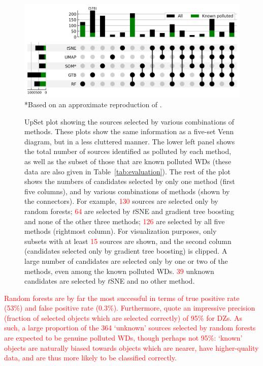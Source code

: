 \documentclass[fleqn,usenatbib]{rasti}
\newcommand{\red}[1]{\textcolor{red}{#1}}
\begin{document}
\begin{figure}
\centering
\includegraphics[width=\textwidth]{figures/fig7_upset.png}
*Based on an approximate reproduction of \citet{perezcouto24}.
\caption{
    UpSet plot \citep{lex14} showing the sources selected by various combinations of methods.
    These plots show the same information as a five-set Venn diagram, but in a less cluttered manner.
    The lower left panel shows the total number of sources identified as polluted by each method, as well as the subset of those that are known polluted WDs (these data are also given in Table~\ref{tab:evaluation}).
    The rest of the plot shows the numbers of candidates selected by only one method (first five columns), and by various combinations of methods (shown by the connectors).
    For example, \red{130} sources are selected only by random forests; \red{64} are selected by $t$SNE and gradient tree boosting and none of the other three methods; \red{126} are selected by all five methods (rightmost column).
    For visualization purposes, only subsets with at least \red{15} sources are shown, and the second column (candidates selected only by gradient tree boosting) is clipped.
    A large number of candidates are selected only by one or two of the methods, even among the known polluted WDs.
    \red{39} unknown candidates are selected by $t$SNE and no other method.
}
\label{fig:overlap}
\end{figure}

\red{
Random forests are by far the most successful in terms of true positive rate (53\%) and false positive rate (0.3\%).
Furthermore, \citet{garciazamora25} quote an impressive precision (fraction of selected objects which are selected correctly) of 95\% for DZs.
As such, a large proportion of the 364 `unknown' sources selected by random forests are expected to be genuine polluted WDs, though perhaps not 95\%: `known' objects are naturally biased towards objects which are nearer, have higher-quality data, and are thus more likely to be classified correctly.
}
\end{document}
